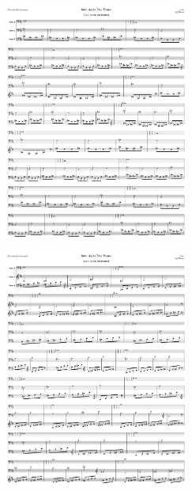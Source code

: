 \begin{figure}[H]                                             
{                                                             
  \setlength{\tabcolsep}{3.0pt}                               
  \setlength\cmidrulewidth{\heavyrulewidth} %
    \begin{subfigure}{0.5\textwidth}                            
  \includegraphics[width=6cm]{music/title_no_79_page_1001.png}%
    \end{subfigure}                                             
  \begin{subfigure}{0.5\textwidth}                            
  \includegraphics[width=6cm]{music/title_no_80_page_1001.png}%
    \end{subfigure}                                             
}                                                             
\end{figure}                                                  


